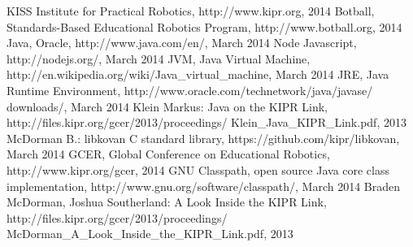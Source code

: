 \documentclass{juniorjournal}
\begin{document}
\begin{thebibliography}{500} %
  KISS Institute for Practical Robotics,
  http://www.kipr.org, 2014
  Botball, Standards-Based Educational Robotics Program, 
  http://www.botball.org, 2014
  Java, Oracle,
  http://www.java.com/en/, March 2014
  Node Javascript, 
  http://nodejs.org/, March 2014
  JVM, Java Virtual Machine,
  http://en.wikipedia.org/wiki/Java\_virtual\_machine, March 2014
  JRE, Java Runtime Environment, 
  http://www.oracle.com/technetwork/java/javase/
  downloads/, March 2014
  Klein Markus: \frqq Java on the KIPR Link\flqq  ,
  http://files.kipr.org/gcer/2013/proceedings/
  Klein\_Java\_KIPR\_Link.pdf, 2013
  McDorman B.: libkovan C standard library,
  https://github.com/kipr/libkovan, March 2014
  GCER, Global Conference on Educational Robotics,
  http://www.kipr.org/gcer, 2014
  GNU Classpath, open source Java core class implementation,
  http://www.gnu.org/software/classpath/, March 2014
  Braden McDorman, Joshua Southerland: \frqq A Look Inside the KIPR Link\flqq  ,
  http://files.kipr.org/gcer/2013/proceedings/
  McDorman\_A\_Look\_Inside\_the\_KIPR\_Link.pdf, 2013
\end{thebibliography}
\end{document}
